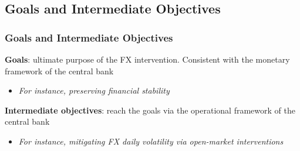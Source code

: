 \documentclass{beamer}
\newenvironment{wideitemize}{\itemize\addtolength{\itemsep}{10pt}}{\enditemize}
\begin{document}
\subsection{Goals and Intermediate Objectives}
\begin{frame}
  \frametitle{Goals and Intermediate Objectives}

  
  \begin{wideitemize}
  \item \textbf{Goals}: ultimate purpose of the FX intervention. Consistent with the monetary framework of the central bank 
    
    \begin{itemize}
    \item \emph{For instance, preserving financial stability}
    \end{itemize}
    
    \item \textbf{Intermediate objectives}: reach the goals via the operational framework of the central bank  
      \begin{itemize}
      \item \emph{For instance, mitigating FX daily volatility via open-market interventions}
      \end{itemize}
      
  \end{wideitemize}
\end{frame}
\end{document}
